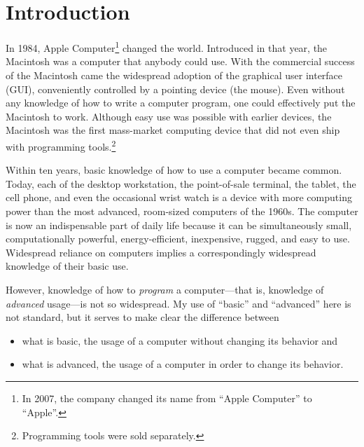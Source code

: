\documentclass[twocolumn]{book}
\title{\doctitle}
\author{Thomas E. Vaughan}
\begin{document}
\frontmatter

\maketitle

\tableofcontents

\mainmatter

\chapter{Introduction}

In 1984, Apple Computer\footnote{%
   In 2007, the company changed its name from ``Apple Computer'' to ``Apple''.}
changed the world.  Introduced in that year, the Macintosh was a computer that
anybody could use.  With the commercial success of the Macintosh came the
widespread adoption of the graphical user interface (GUI), conveniently
controlled by a pointing device (the mouse).  Even without any knowledge of how
to write a computer program, one could effectively put the Macintosh to work.
Although easy use was possible with earlier devices, the Macintosh was the
first mass-market computing device that did not even ship with programming
tools.\footnote{%
   Programming tools were sold separately.}

Within ten years, basic knowledge of how to use a computer became common.
Today, each of the desktop workstation, the point-of-sale terminal, the tablet,
the cell phone, and even the occasional wrist watch is a device with more
computing power than the most advanced, room-sized computers of the 1960s.  The
computer is now an indispensable part of daily life because it can be
simultaneously small, computationally powerful, energy-efficient, inexpensive,
rugged, and easy to use. Widespread reliance on computers implies a
correspondingly widespread knowledge of their basic use.

However, knowledge of how to \emph{program} a computer---that is, knowledge of
\emph{advanced} usage---is not so widespread.  My use of ``basic'' and
``advanced'' here is not standard, but it serves to make clear the difference
between
\begin{itemize}
   \item what is basic, the usage of a computer without changing its behavior
      and
   \item what is advanced, the usage of a computer in order to change its
      behavior.
\end{itemize}
\end{document}

